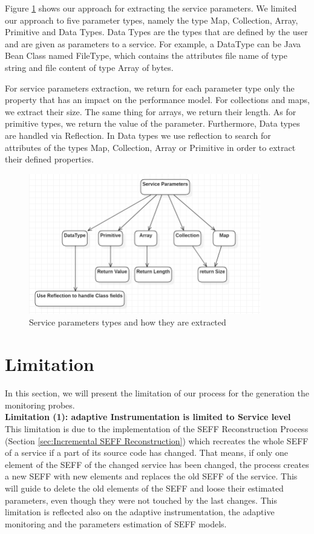 Figure \ref{fig:service_parameters} shows our approach for extracting the service parameters. We limited our approach to five parameter types, namely the type Map, Collection, Array, Primitive and Data Types. Data Types are the types that are defined by the user and are given as parameters to a service. For example, a DataType can be Java Bean Class named FileType, which contains the attributes file name of type string and file content of type Array of bytes.

For service parameters extraction, we return for each parameter type only the property that has an impact on the performance model. For collections and maps, we extract their size. The same thing for arrays, we return their length. As for primitive types, we return the value of the parameter. Furthermore, Data types are handled via Reflection. In Data types we use reflection to search for attributes of the types Map, Collection, Array or Primitive in order to extract their defined properties. 


\begin{figure}[h]
\centering
\includegraphics[width=0.9\textwidth]{figures/service_parameters}
\caption{Service parameters types and how they are extracted}
\label{fig:service_parameters}
\end{figure}


\section{Limitation}
\label{sec:Limitation}
In this section, we will present the limitation of our process for the generation the monitoring probes. \\

\textbf{Limitation (1): adaptive Instrumentation is limited to Service level}\\
This limitation is due to the implementation of the SEFF Reconstruction Process (Section \ref{sec:Incremental SEFF Reconstruction}) which recreates the whole SEFF of a service if a part of its source code has changed. That means, if only one element of the SEFF of the changed service has been changed, the process creates a new SEFF with new elements and replaces the old SEFF of the service. This will guide to delete the old elements of the SEFF and loose their estimated parameters, even though they were not touched by the last changes. This limitation is reflected also on the adaptive instrumentation, the adaptive monitoring and the parameters estimation of SEFF models. 

